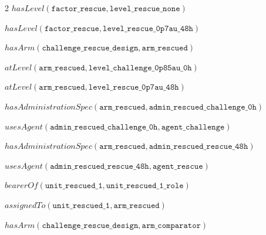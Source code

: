 \documentclass[10pt,a4paper]{article}
\begin{document}
{\begin{multicols}{2}
$\mathit{hasLevel}(\mathtt{factor\_\allowbreak{}\allowbreak{}rescue}, \mathtt{level\_\allowbreak{}\allowbreak{}rescue\_\allowbreak{}\allowbreak{}none})$\par
$\mathit{hasLevel}(\mathtt{factor\_\allowbreak{}\allowbreak{}rescue}, \mathtt{level\_\allowbreak{}\allowbreak{}rescue\_\allowbreak{}\allowbreak{}0p7au\_\allowbreak{}\allowbreak{}48h})$\par
$\mathit{hasArm}(\mathtt{challenge\_\allowbreak{}\allowbreak{}rescue\_\allowbreak{}\allowbreak{}design}, \mathtt{arm\_\allowbreak{}\allowbreak{}rescued})$\par
$\mathit{atLevel}(\mathtt{arm\_\allowbreak{}\allowbreak{}rescued}, \mathtt{level\_\allowbreak{}\allowbreak{}challenge\_\allowbreak{}\allowbreak{}0p85au\_\allowbreak{}\allowbreak{}0h})$\par
$\mathit{atLevel}(\mathtt{arm\_\allowbreak{}\allowbreak{}rescued}, \mathtt{level\_\allowbreak{}\allowbreak{}rescue\_\allowbreak{}\allowbreak{}0p7au\_\allowbreak{}\allowbreak{}48h})$\par
$\mathit{hasAdministrationSpec}(\mathtt{arm\_\allowbreak{}\allowbreak{}rescued}, \mathtt{admin\_\allowbreak{}\allowbreak{}rescued\_\allowbreak{}\allowbreak{}challenge\_\allowbreak{}\allowbreak{}0h})$\par
$\mathit{usesAgent}(\mathtt{admin\_\allowbreak{}\allowbreak{}rescued\_\allowbreak{}\allowbreak{}challenge\_\allowbreak{}\allowbreak{}0h}, \mathtt{agent\_\allowbreak{}\allowbreak{}challenge})$\par
$\mathit{hasAdministrationSpec}(\mathtt{arm\_\allowbreak{}\allowbreak{}rescued}, \mathtt{admin\_\allowbreak{}\allowbreak{}rescued\_\allowbreak{}\allowbreak{}rescue\_\allowbreak{}\allowbreak{}48h})$\par
$\mathit{usesAgent}(\mathtt{admin\_\allowbreak{}\allowbreak{}rescued\_\allowbreak{}\allowbreak{}rescue\_\allowbreak{}\allowbreak{}48h}, \mathtt{agent\_\allowbreak{}\allowbreak{}rescue})$\par
$\mathit{bearerOf}(\mathtt{unit\_\allowbreak{}\allowbreak{}rescued\_\allowbreak{}\allowbreak{}1}, \mathtt{unit\_\allowbreak{}\allowbreak{}rescued\_\allowbreak{}\allowbreak{}1\_\allowbreak{}\allowbreak{}role})$\par
$\mathit{assignedTo}(\mathtt{unit\_\allowbreak{}\allowbreak{}rescued\_\allowbreak{}\allowbreak{}1}, \mathtt{arm\_\allowbreak{}\allowbreak{}rescued})$\par
$\mathit{hasArm}(\mathtt{challenge\_\allowbreak{}\allowbreak{}rescue\_\allowbreak{}\allowbreak{}design}, \mathtt{arm\_\allowbreak{}\allowbreak{}comparator})$\par

\end{multicols}}
\end{document}
